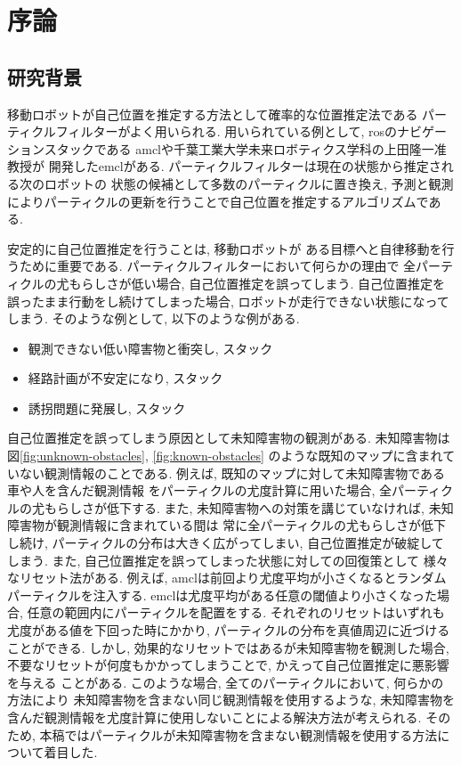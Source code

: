 \chapter{序論}

\section{研究背景}

移動ロボットが自己位置を推定する方法として確率的な位置推定法である
パーティクルフィルターがよく用いられる. 
用いられている例として, rosのナビゲーションスタックである
amcl\cite{amcl_github}や千葉工業大学未来ロボティクス学科の上田隆一准教授が
開発したemcl\cite{emcl_github}がある. 
パーティクルフィルターは現在の状態から推定される次のロボットの
状態の候補として多数のパーティクルに置き換え, 
予測と観測によりパーティクルの更新を行うことで自己位置を推定するアルゴリズムである. 

安定的に自己位置推定を行うことは, 移動ロボットが
ある目標へと自律移動を行うために重要である. 
パーティクルフィルターにおいて何らかの理由で
全パーティクルの尤もらしさが低い場合, 
自己位置推定を誤ってしまう. 
自己位置推定を誤ったまま行動をし続けてしまった場合, 
ロボットが走行できない状態になってしまう. 
そのような例として, 以下のような例がある. 

\begin{itemize}
  \item 観測できない低い障害物と衝突し, スタック
  \item 経路計画が不安定になり, スタック
  \item 誘拐問題\cite{gutmann2002etal}に発展し, スタック
\end{itemize}

自己位置推定を誤ってしまう原因として未知障害物の観測がある. 
未知障害物は図\ref{fig:unknown-obstacles}, \ref{fig:known-obstacles}
のような既知のマップに含まれていない観測情報のことである. 
例えば, 既知のマップに対して未知障害物である車や人を含んだ観測情報
をパーティクルの尤度計算に用いた場合, 全パーティクルの尤もらしさが低下する. 
また, 未知障害物への対策を講じていなければ, 未知障害物が観測情報に含まれている間は
常に全パーティクルの尤もらしさが低下し続け, パーティクルの分布は大きく広がってしまい, 
自己位置推定が破綻してしまう. また, 自己位置推定を誤ってしまった状態に対しての回復策として
様々なリセット法がある. 
例えば, amclは前回より尤度平均が小さくなるとランダムパーティクルを注入する. 
emclは尤度平均がある任意の閾値より小さくなった場合, 
任意の範囲内にパーティクルを配置をする\cite{ueda2004iros}. 
それぞれのリセットはいずれも尤度がある値を下回った時にかかり, 
パーティクルの分布を真値周辺に近づけることができる. 
しかし, 効果的なリセットではあるが未知障害物を観測した場合, 
不要なリセットが何度もかかってしまうことで, かえって自己位置推定に悪影響を与える
ことがある. 
このような場合, 全てのパーティクルにおいて, 何らかの方法により
未知障害物を含まない同じ観測情報を使用するような, 
未知障害物を含んだ観測情報を尤度計算に使用しないことによる解決方法が考えられる. 
そのため, 本稿ではパーティクルが未知障害物を含まない観測情報を使用する方法について着目した. 

